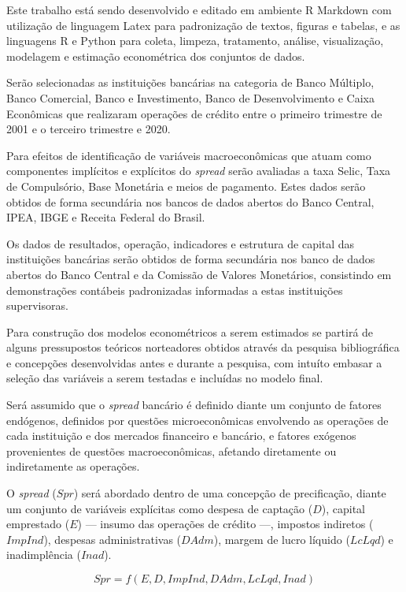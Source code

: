\documentclass[
  12pt,
  12pt,
  openright,
  oneside,
  a4paper,
  chapter=TITLE,
  section=TITLE,
  subsection=TITLE,
  subsubsection=TITLE,
  english,
  portugues,
  sumario=tradicional]{abntex2}
\begin{document}
Este trabalho está sendo desenvolvido e editado em ambiente R Markdown com utilização de linguagem Latex para padronização de textos, figuras e tabelas, e as linguagens R e Python para coleta, limpeza, tratamento, análise, visualização, modelagem e estimação econométrica dos conjuntos de dados.

Serão selecionadas as instituições bancárias na categoria de Banco Múltiplo, Banco Comercial, Banco e Investimento, Banco de Desenvolvimento e Caixa Econômicas que realizaram operações de crédito entre o primeiro trimestre de 2001 e o terceiro trimestre e 2020.

Para efeitos de identificação de variáveis macroeconômicas que atuam como componentes implícitos e explícitos do \emph{spread} serão avaliadas a taxa Selic, Taxa de Compulsório, Base Monetária e meios de pagamento. Estes dados serão obtidos de forma secundária nos bancos de dados abertos do Banco Central, IPEA, IBGE e Receita Federal do Brasil.

Os dados de resultados, operação, indicadores e estrutura de capital das instituições bancárias serão obtidos de forma secundária nos banco de dados abertos do Banco Central e da Comissão de Valores Monetários, consistindo em demonstrações contábeis padronizadas informadas a estas instituições supervisoras.

Para construção dos modelos econométricos a serem estimados se partirá de alguns pressupostos teóricos norteadores obtidos através da pesquisa bibliográfica e concepções desenvolvidas antes e durante a pesquisa, com intuíto embasar a seleção das variáveis a serem testadas e incluídas no modelo final.

Será assumido que o \emph{spread} bancário é definido diante um conjunto de fatores endógenos, definidos por questões microeconômicas envolvendo as operações de cada instituição e dos mercados financeiro e bancário, e fatores exógenos provenientes de questões macroeconômicas, afetando diretamente ou indiretamente as operações.

O \emph{spread} (\(Spr\)) será abordado dentro de uma concepção de precificação, diante um conjunto de variáveis explícitas como despesa de captação (\(D\)), capital emprestado (\(E\)) --- insumo das operações de crédito ---, impostos indiretos (\(ImpInd\)), despesas administrativas (\(DAdm\)), margem de lucro líquido (\(LcLqd\)) e inadimplência (\(Inad\)).

\begin{equation}
Spr = f(E,D,ImpInd,DAdm,LcLqd,Inad)
\end{equation}
\end{document}
